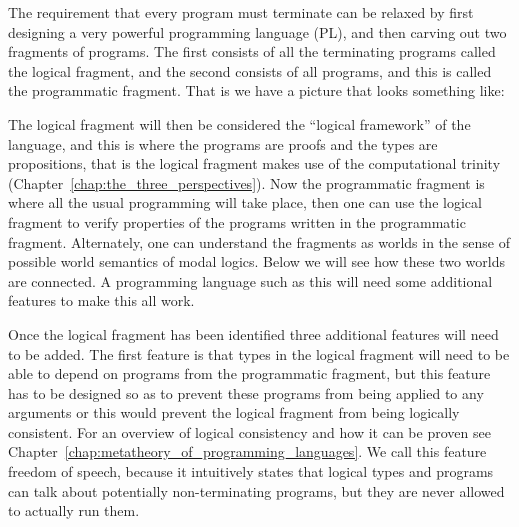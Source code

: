 

\renewcommand{\FSdrulename}[1]{\textsc{\scriptsize #1}}

\newcommand{\tvdash}[1]{\vdash^{#1}}
\newcommand{\arrowT}[5]{(#1 :^{#2} #3)^{#4} \to #5}
\newcommand{\rec}[3]{rec\ #1\ #2\ #3}
\newcommand{\recc}[3]{rec^{-}\ #1\ #3}

The requirement that every program must terminate can be relaxed by
first designing a very powerful programming language (PL), and then
carving out two fragments of programs. The first consists of all the
terminating programs called the logical fragment, and the second
consists of all programs, and this is called the programmatic
fragment. That is we have a picture that looks something like:
\begin{center}
\end{center}
The logical fragment will then be considered the ``logical framework''
of the language, and this is where the programs are proofs and the
types are propositions, that is the logical fragment makes use of the
computational trinity (Chapter~\ref{chap:the_three_perspectives}).
Now the programmatic fragment is where all the usual programming will
take place, then one can use the logical fragment to verify properties
of the programs written in the programmatic fragment.  Alternately,
one can understand the fragments as worlds in the sense of possible
world semantics of modal logics.  Below we will see how these two
worlds are connected.  A programming language such as this will need
some additional features to make this all work.

Once the logical fragment has been identified three additional
features will need to be added.  The first feature is that types in
the logical fragment will need to be able to depend on programs from
the programmatic fragment, but this feature has to be designed so as
to prevent these programs from being applied to any arguments or this
would prevent the logical fragment from being logically consistent.
For an overview of logical consistency and how it can be proven see
Chapter~\ref{chap:metatheory_of_programming_languages}.  We call this
feature freedom of speech, because it intuitively states that logical
types and programs can talk about potentially non-terminating
programs, but they are never allowed to actually run them.

